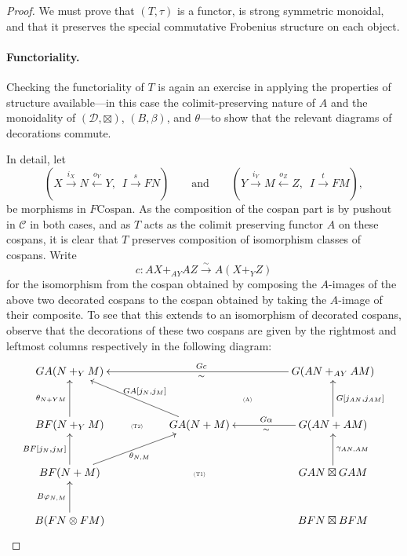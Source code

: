 \begin{proof}
  We must prove that $(T,\tau)$ is a functor, is strong symmetric monoidal, and
  that it preserves the special commutative Frobenius structure on each object.

  \paragraph{Functoriality.}
  Checking the functoriality of $T$ is again an exercise in applying the
  properties of structure available---in this case the colimit-preserving nature
  of $A$ and the monoidality of $(\mathcal D,\boxtimes)$, $(B,\beta)$, and
  $\theta$---to show that the relevant diagrams of decorations commute. 

  In detail, let 
  \[
    (X \stackrel{i_X}\longrightarrow N \stackrel{o_Y}\longleftarrow Y, \enspace I
    \stackrel{s}\longrightarrow FN)
    \qquad \mbox{and} \qquad
    (Y \stackrel{i_Y}\longrightarrow M \stackrel{o_Z}\longleftarrow Z, \enspace I
    \stackrel{t}\longrightarrow FM), 
  \]
  be morphisms in $F\mathrm{Cospan}$. As the composition of the cospan part is by
  pushout in $\mathcal C$ in both cases, and as $T$ acts as the colimit preserving
  functor $A$ on these cospans, it is clear that $T$ preserves composition of
  isomorphism classes of cospans. Write
  \[
    c\colon  AX+_{AY}AZ \stackrel\sim\longrightarrow A(X+_YZ)
  \]
  for the isomorphism from the cospan obtained by composing the $A$-images of the
  above two decorated cospans to the cospan obtained by taking the $A$-image of their
  composite. To see that this extends to an isomorphism of decorated cospans,
  observe that the decorations of these two cospans are given by the rightmost and
  leftmost columns respectively in the following diagram:
  \[
    \xymatrixcolsep{.5pc}
    \xymatrixrowsep{.9pc}
    \xymatrix{ 
      GA(N+_YM) &&&&&&&& \ar[llllllll]_{Gc}^{\sim} G(AN+_{AY}AM) \\
      &&&&& \textsc{\tiny(A)} \\
      BF(N+_YM) \ar[uu]^{\theta_{N+YM}} && \textsc{\tiny(T2)} && GA(N+M)
      \ar[uullll]_{GA[j_N,j_M]} &&&& G(AN+AM) \ar[uu]_{G[j_{AN},j_{AM}]}
      \ar[llll]^{\sim}_{G\alpha} \\
      \\
      BF(N+M) \ar[uu]^{BF[j_N,j_M]} \ar[uurrrr]_{\theta_{N,M}} &&&&
      \textsc{\tiny(T1)} &&&& GAN \boxtimes GAM \ar[uu]_{\gamma_{AN,AM}} \\
      \\
      B(FN \otimes FM) \ar[uu]^{B\varphi_{N,M}} &&&&&&&& BFN \boxtimes BFM
}\]
\end{proof}
